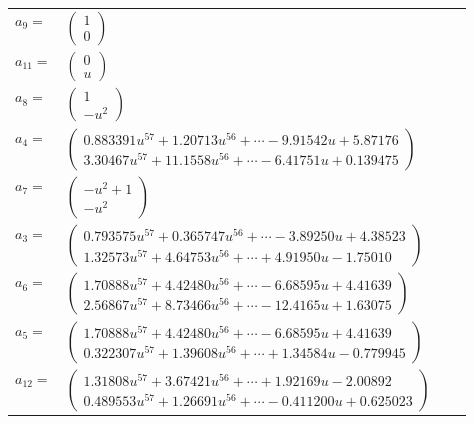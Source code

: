 \documentclass[1p]{elsarticle_modified}
\theoremstyle{definition}
\begin{document}
\begin{tabular}{m{7pt} m{180pt} m{7pt} m{180pt} }
\flushright $a_{9}=$&$\begin{pmatrix}1\\0\end{pmatrix}$ \\
\flushright $a_{11}=$&$\begin{pmatrix}0\\u\end{pmatrix}$ \\
\flushright $a_{8}=$&$\begin{pmatrix}1\\- u^2\end{pmatrix}$ \\
\flushright $a_{4}=$&$\begin{pmatrix}0.883391 u^{57}+1.20713 u^{56}+\cdots-9.91542 u+5.87176\\3.30467 u^{57}+11.1558 u^{56}+\cdots-6.41751 u+0.139475\end{pmatrix}$ \\
\flushright $a_{7}=$&$\begin{pmatrix}- u^2+1\\- u^2\end{pmatrix}$ \\
\flushright $a_{3}=$&$\begin{pmatrix}0.793575 u^{57}+0.365747 u^{56}+\cdots-3.89250 u+4.38523\\1.32573 u^{57}+4.64753 u^{56}+\cdots+4.91950 u-1.75010\end{pmatrix}$ \\
\flushright $a_{6}=$&$\begin{pmatrix}1.70888 u^{57}+4.42480 u^{56}+\cdots-6.68595 u+4.41639\\2.56867 u^{57}+8.73466 u^{56}+\cdots-12.4165 u+1.63075\end{pmatrix}$ \\
\flushright $a_{5}=$&$\begin{pmatrix}1.70888 u^{57}+4.42480 u^{56}+\cdots-6.68595 u+4.41639\\0.322307 u^{57}+1.39608 u^{56}+\cdots+1.34584 u-0.779945\end{pmatrix}$ \\
\flushright $a_{12}=$&$\begin{pmatrix}1.31808 u^{57}+3.67421 u^{56}+\cdots+1.92169 u-2.00892\\0.489553 u^{57}+1.26691 u^{56}+\cdots-0.411200 u+0.625023\end{pmatrix}$ \\

\end{tabular}
\end{document}
